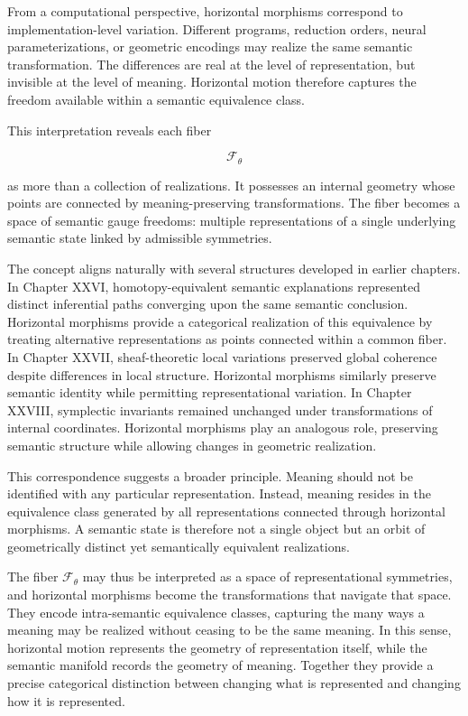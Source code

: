 \documentclass[12pt,letterpaper]{article}
\theoremstyle{remark}
\begin{document}
From a computational perspective, horizontal morphisms correspond to implementation-level variation. Different programs, reduction orders, neural parameterizations, or geometric encodings may realize the same semantic transformation. The differences are real at the level of representation, but invisible at the level of meaning. Horizontal motion therefore captures the freedom available within a semantic equivalence class.

This interpretation reveals each fiber

\[
\mathcal{F}_{\theta}
\]

as more than a collection of realizations. It possesses an internal geometry whose points are connected by meaning-preserving transformations. The fiber becomes a space of semantic gauge freedoms: multiple representations of a single underlying semantic state linked by admissible symmetries.

The concept aligns naturally with several structures developed in earlier chapters. In Chapter XXVI, homotopy-equivalent semantic explanations represented distinct inferential paths converging upon the same semantic conclusion. Horizontal morphisms provide a categorical realization of this equivalence by treating alternative representations as points connected within a common fiber. In Chapter XXVII, sheaf-theoretic local variations preserved global coherence despite differences in local structure. Horizontal morphisms similarly preserve semantic identity while permitting representational variation. In Chapter XXVIII, symplectic invariants remained unchanged under transformations of internal coordinates. Horizontal morphisms play an analogous role, preserving semantic structure while allowing changes in geometric realization.

This correspondence suggests a broader principle. Meaning should not be identified with any particular representation. Instead, meaning resides in the equivalence class generated by all representations connected through horizontal morphisms. A semantic state is therefore not a single object but an orbit of geometrically distinct yet semantically equivalent realizations.

The fiber $\mathcal{F}_{\theta}$ may thus be interpreted as a space of representational symmetries, and horizontal morphisms become the transformations that navigate that space. They encode intra-semantic equivalence classes, capturing the many ways a meaning may be realized without ceasing to be the same meaning. In this sense, horizontal motion represents the geometry of representation itself, while the semantic manifold records the geometry of meaning. Together they provide a precise categorical distinction between changing what is represented and changing how it is represented.
\end{document}
